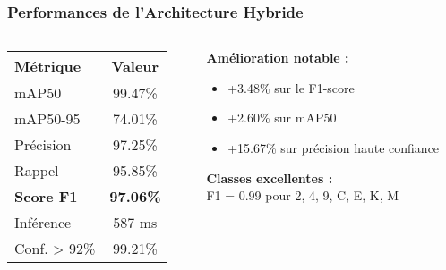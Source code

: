 \documentclass[
	11pt,
	aspectratio=169,
]{beamer}
\begin{document}
\begin{frame}
	\frametitle{Performances de l'Architecture Hybride}
	
	\begin{columns}[c]
		\begin{column}{0.5\textwidth}
			\begin{table}
				\centering
				\begin{tabular}{lc}
					\toprule
					\textbf{Métrique} & \textbf{Valeur} \\
					\midrule
					mAP50 & 99.47\% \\
					mAP50-95 & 74.01\% \\
					Précision & 97.25\% \\
					Rappel & 95.85\% \\
					\textbf{Score F1} & \textbf{97.06\%} \\
					Inférence & 587 ms \\
					Conf. > 92\% & 99.21\% \\
					\bottomrule
				\end{tabular}
			\end{table}
		\end{column}
		
		\begin{column}{0.5\textwidth}
			\textbf{Amélioration notable :}
			\begin{itemize}
				\item \alert{+3.48\%} sur le F1-score
				\item \alert{+2.60\%} sur mAP50
				\item \alert{+15.67\%} sur précision haute confiance
			\end{itemize}
			
			\bigskip
			
			\textbf{Classes excellentes :}\\
			F1 = 0.99 pour 2, 4, 9, C, E, K, M
		\end{column}
	\end{columns}
\end{frame}

\end{document}
